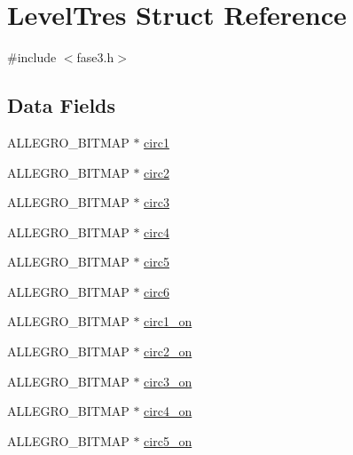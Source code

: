 \hypertarget{struct_level_tres}{\section{Level\-Tres Struct Reference}
\label{struct_level_tres}
}


{\ttfamily \#include $<$fase3.\-h$>$}

\subsection*{Data Fields}
\begin{DoxyCompactItemize}
\item 
A\-L\-L\-E\-G\-R\-O\-\_\-\-B\-I\-T\-M\-A\-P $\ast$ \hyperlink{struct_level_tres_a9877f31790b6d2f38fb468a9448223f1}{circ1}
\item 
A\-L\-L\-E\-G\-R\-O\-\_\-\-B\-I\-T\-M\-A\-P $\ast$ \hyperlink{struct_level_tres_a1b8836cb8a00a286c87bfbafdacbd03d}{circ2}
\item 
A\-L\-L\-E\-G\-R\-O\-\_\-\-B\-I\-T\-M\-A\-P $\ast$ \hyperlink{struct_level_tres_aaa21201ceebf455212233414bd6eedbc}{circ3}
\item 
A\-L\-L\-E\-G\-R\-O\-\_\-\-B\-I\-T\-M\-A\-P $\ast$ \hyperlink{struct_level_tres_a1adf43c25b4c9b87aeb45c1e4bd24d4f}{circ4}
\item 
A\-L\-L\-E\-G\-R\-O\-\_\-\-B\-I\-T\-M\-A\-P $\ast$ \hyperlink{struct_level_tres_a6444f15bb917b382f7e91576f46c2706}{circ5}
\item 
A\-L\-L\-E\-G\-R\-O\-\_\-\-B\-I\-T\-M\-A\-P $\ast$ \hyperlink{struct_level_tres_a727b47ddfdf73dd07d1a2832fc0f24f9}{circ6}
\item 
A\-L\-L\-E\-G\-R\-O\-\_\-\-B\-I\-T\-M\-A\-P $\ast$ \hyperlink{struct_level_tres_a15699608afb18fad793848cd8fd32fe0}{circ1\-\_\-on}
\item 
A\-L\-L\-E\-G\-R\-O\-\_\-\-B\-I\-T\-M\-A\-P $\ast$ \hyperlink{struct_level_tres_aa582b8f9acdbb85a2d1d54705e26fa15}{circ2\-\_\-on}
\item 
A\-L\-L\-E\-G\-R\-O\-\_\-\-B\-I\-T\-M\-A\-P $\ast$ \hyperlink{struct_level_tres_ad58139cfabe6836662aec8a3293c9208}{circ3\-\_\-on}
\item 
A\-L\-L\-E\-G\-R\-O\-\_\-\-B\-I\-T\-M\-A\-P $\ast$ \hyperlink{struct_level_tres_ae514d3cf3c3cb83de5ab4682ead1c7f6}{circ4\-\_\-on}
\item 
A\-L\-L\-E\-G\-R\-O\-\_\-\-B\-I\-T\-M\-A\-P $\ast$ \hyperlink{struct_level_tres_a1537bde5184cc347504f101c712fb0ee}{circ5\-\_\-on}
\item 

\end{DoxyCompactItemize}
